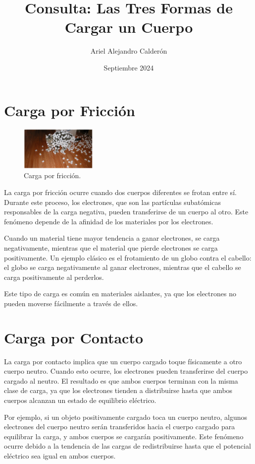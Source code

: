 \documentclass{article}
\title{Consulta: Las Tres Formas de Cargar un Cuerpo}
\author{Ariel Alejandro Calderón}
\date{Septiembre 2024}
\begin{document}
\maketitle

\section{Carga por Fricción}


\begin{figure}
    \centering
    \includegraphics[width=0.33\textwidth]{./public/friccion.png}
    \caption{Carga por fricción.}
\end{figure}

La carga por fricción ocurre cuando dos cuerpos diferentes se frotan entre sí. Durante este proceso, los electrones, que son las partículas subatómicas responsables de la carga negativa, pueden transferirse de un cuerpo al otro. Este fenómeno depende de la afinidad de los materiales por los electrones. 

Cuando un material tiene mayor tendencia a ganar electrones, se carga negativamente, mientras que el material que pierde electrones se carga positivamente. Un ejemplo clásico es el frotamiento de un globo contra el cabello: el globo se carga negativamente al ganar electrones, mientras que el cabello se carga positivamente al perderlos.

Este tipo de carga es común en materiales aislantes, ya que los electrones no pueden moverse fácilmente a través de ellos.

\section{Carga por Contacto}
La carga por contacto implica que un cuerpo cargado toque físicamente a otro cuerpo neutro. Cuando esto ocurre, los electrones pueden transferirse del cuerpo cargado al neutro. El resultado es que ambos cuerpos terminan con la misma clase de carga, ya que los electrones tienden a distribuirse hasta que ambos cuerpos alcanzan un estado de equilibrio eléctrico.

Por ejemplo, si un objeto positivamente cargado toca un cuerpo neutro, algunos electrones del cuerpo neutro serán transferidos hacia el cuerpo cargado para equilibrar la carga, y ambos cuerpos se cargarán positivamente. Este fenómeno ocurre debido a la tendencia de las cargas de redistribuirse hasta que el potencial eléctrico sea igual en ambos cuerpos.
\end{document}
